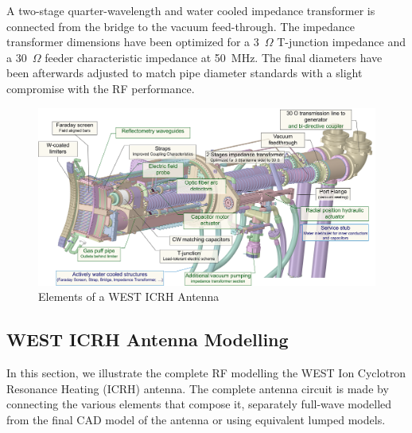 {A two-stage quarter-wavelength and water cooled impedance transformer is connected from the bridge to the vacuum feed-through. The impedance transformer dimensions have been optimized for a 3~$\si{\Omega}$ T-junction impedance and a 30~$\si{\Omega}$ feeder characteristic impedance at 50~MHz. The final diameters have been afterwards adjusted to match pipe diameter standards with a slight compromise with the RF performance. 




\begin{figure}
	\centering
	\includegraphics[width=1.0\linewidth]{figures/chap3/WEST_ICRH/WEST_ICRH_antenna_elements}
	\caption{Elements of a WEST ICRH Antenna}
	\label{fig:westicrhantennaelements}
\end{figure}

\clearpage

\subsection{WEST ICRH Antenna Modelling}\label{sec:WEST_ICRH_antenna_modelling}
In this section, we illustrate the complete RF modelling the WEST Ion Cyclotron Resonance Heating (ICRH) antenna. The complete antenna circuit is made by connecting the various elements that compose it, separately full-wave modelled from the final CAD model of the antenna or using equivalent lumped models. 

}
